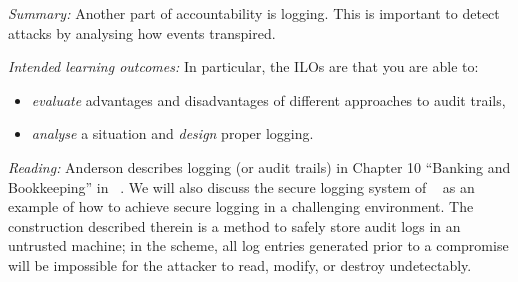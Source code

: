 \emph{Summary:}
Another part of accountability is logging.
This is important to detect attacks by analysing how events transpired.

\emph{Intended learning outcomes:}
In particular, the \acp{ILO} are that you are able to:
\begin{itemize}
  \item \emph{evaluate} advantages and disadvantages of different approaches to 
    audit trails,
  \item \emph{analyse} a situation and \emph{design} proper logging.
\end{itemize}

\emph{Reading:}
Anderson describes logging (or audit trails) in Chapter 
10 \enquote{Banking and Bookkeeping} in 
~\cite{Anderson2008sea}.
We will also discuss the secure logging system of 
\citeauthor{schneier1999secure}~\cite{schneier1999secure} as an example of how 
to achieve secure logging in a challenging environment.
The construction described therein is a method to safely store audit logs in an 
untrusted machine; in the scheme, all log entries generated prior to 
a compromise will be impossible for the attacker to read, modify, or destroy 
undetectably.
